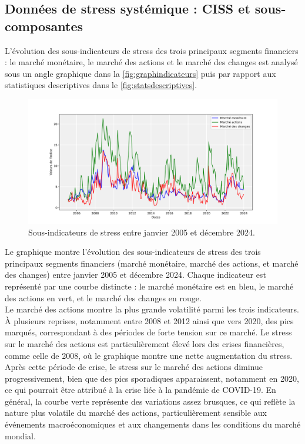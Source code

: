 \subsection{Données de stress systémique : CISS et sous-composantes}

L'évolution des sous-indicateurs de stress des trois principaux segments financiers : le marché monétaire, le marché des actions et le marché des changes est analysé sous un angle graphique dans la \autoref{fig:graphindicateurs} puis par rapport aux statistiques descriptives dans le \autoref{fig:statsdescriptives}.

\begin{figure}[H]
    \centering
    \includegraphics[width=1\linewidth]{images/sous_indicateurs_stress.png}
    \caption{Sous-indicateurs de stress entre janvier 2005 et décembre 2024.}
    \label{fig:graphindicateurs}
\end{figure}

Le graphique montre l'évolution des sous-indicateurs de stress des trois principaux segments financiers (marché monétaire, marché des actions, et marché des changes) entre janvier 2005 et décembre 2024. Chaque indicateur est représenté par une courbe distincte : le marché monétaire est en bleu, le marché des actions en vert, et le marché des changes en rouge.\\

Le marché des actions montre la plus grande volatilité parmi les trois indicateurs. À plusieurs reprises, notamment entre 2008 et 2012 ainsi que vers 2020, des pics marqués, correspondant à des périodes de forte tension sur ce marché. Le stress sur le marché des actions est particulièrement élevé lors des crises financières, comme celle de 2008, où le graphique montre une nette augmentation du stress. Après cette période de crise, le stress sur le marché des actions diminue progressivement, bien que des pics sporadiques apparaissent, notamment en 2020, ce qui pourrait être attribué à la crise liée à la pandémie de COVID-19. En général, la courbe verte représente des variations assez brusques, ce qui reflète la nature plus volatile du marché des actions, particulièrement sensible aux événements macroéconomiques et aux changements dans les conditions du marché mondial.

